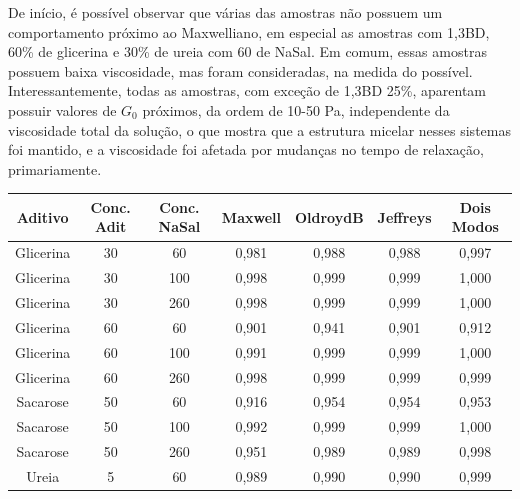 	De início, é possível observar que várias das amostras não possuem um comportamento próximo ao Maxwelliano, em especial as amostras com 1,3BD, 60\% de glicerina e 30\% de ureia com 60 \mM{} de NaSal. Em comum, essas amostras possuem baixa viscosidade, mas foram consideradas, na medida do possível. Interessantemente, todas as amostras, com exceção de 1,3BD 25\%, aparentam possuir valores de \(G_0\) próximos, da ordem de 10-50 Pa, independente da viscosidade total da solução, o que mostra que a estrutura micelar nesses sistemas foi mantido, e a viscosidade foi afetada por mudanças no tempo de relaxação, primariamente.




	\begin{table}[h]
		{%
			\begin{tabular}{c c c | c c c c}
				\toprule
				 Aditivo  & Conc. Adit & Conc. NaSal & Maxwell & OldroydB & Jeffreys & Dois Modos \\ \midrule
				Glicerina & 30        & 60         & 0,981   & 0,988    & 0,988    & 0,997      \\
				Glicerina & 30        & 100        & 0,998   & 0,999    & 0,999    & 1,000      \\
				Glicerina & 30        & 260        & 0,998   & 0,999    & 0,999    & 1,000      \\
				Glicerina & 60        & 60         & 0,901   & 0,941    & 0,901    & 0,912      \\
				Glicerina & 60        & 100        & 0,991   & 0,999    & 0,999    & 1,000      \\
				Glicerina & 60        & 260        & 0,998   & 0,999    & 0,999    & 0,999      \\
				Sacarose  & 50        & 60         & 0,916   & 0,954    & 0,954    & 0,953      \\
				Sacarose  & 50        & 100        & 0,992   & 0,999    & 0,999    & 1,000      \\
				Sacarose  & 50        & 260        & 0,951   & 0,989    & 0,989    & 0,998      \\ \midrule
				  Ureia   & 5         & 60         & 0,989   & 0,990    & 0,990    & 0,999      \\

\end{tabular}}
\end{table}
